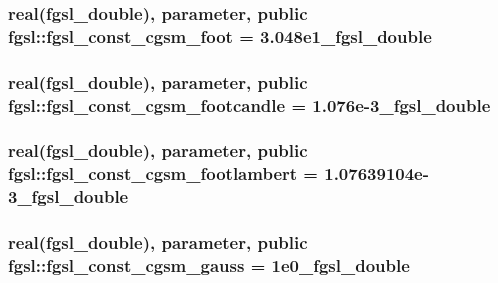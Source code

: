 \hypertarget{classfgsl_a479fa8c0e8ae3d17e949a4a365a39c19}{
\subsubsection[{fgsl\-\_\-const\-\_\-cgsm\-\_\-foot}]{\setlength{\rightskip}{0pt plus 5cm}real({\bf fgsl\-\_\-double}), parameter, public fgsl\-::fgsl\-\_\-const\-\_\-cgsm\-\_\-foot = 3.\-048e1\-\_\-fgsl\-\_\-double}}\label{classfgsl_a479fa8c0e8ae3d17e949a4a365a39c19}
\hypertarget{classfgsl_ab94d2a4bddeb2056b97285714a740131}{
\subsubsection[{fgsl\-\_\-const\-\_\-cgsm\-\_\-footcandle}]{\setlength{\rightskip}{0pt plus 5cm}real({\bf fgsl\-\_\-double}), parameter, public fgsl\-::fgsl\-\_\-const\-\_\-cgsm\-\_\-footcandle = 1.\-076e-\/3\-\_\-fgsl\-\_\-double}}\label{classfgsl_ab94d2a4bddeb2056b97285714a740131}
\hypertarget{classfgsl_a392158d18a3d487acc9ed9d88636066c}{
\subsubsection[{fgsl\-\_\-const\-\_\-cgsm\-\_\-footlambert}]{\setlength{\rightskip}{0pt plus 5cm}real({\bf fgsl\-\_\-double}), parameter, public fgsl\-::fgsl\-\_\-const\-\_\-cgsm\-\_\-footlambert = 1.\-07639104e-\/3\-\_\-fgsl\-\_\-double}}\label{classfgsl_a392158d18a3d487acc9ed9d88636066c}
\hypertarget{classfgsl_af917fb04d607724208d74a65a71644fe}{
\subsubsection[{fgsl\-\_\-const\-\_\-cgsm\-\_\-gauss}]{\setlength{\rightskip}{0pt plus 5cm}real({\bf fgsl\-\_\-double}), parameter, public fgsl\-::fgsl\-\_\-const\-\_\-cgsm\-\_\-gauss = 1e0\-\_\-fgsl\-\_\-double}}\label{classfgsl_af917fb04d607724208d74a65a71644fe}
